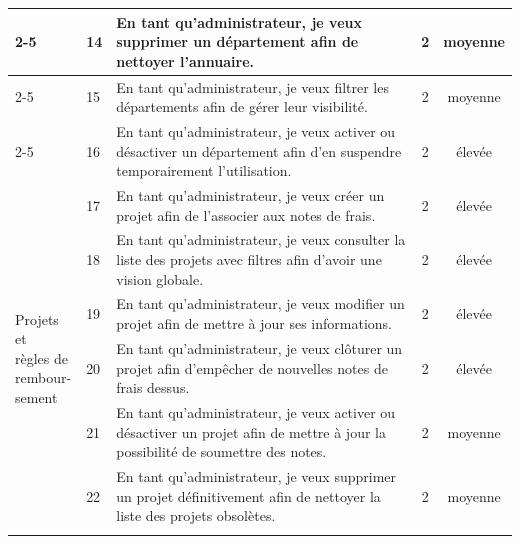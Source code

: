 \documentclass[12pt,a4paper]{report}
\begin{document}
\begin{longtable}{|p{2cm}|p{1cm}|p{8.3cm}|c|c|}
\cline{2-5}

& 14 & En tant qu'administrateur, je veux supprimer un département afin de nettoyer l’annuaire. & 2 & moyenne \\

\cline{2-5}

& 15 & En tant qu'administrateur, je veux filtrer les départements afin de gérer leur visibilité. & 2 & moyenne \\

\cline{2-5}

& 16 & En tant qu'administrateur, je veux activer ou désactiver un département afin d’en suspendre temporairement l’utilisation. & 2 & élevée \\

\hline



\multirow{8}{*}{\parbox{2.8cm}{ Projets et\\règles de\\rembour-\\sement}} & 17 & En tant qu'administrateur, je veux créer un projet afin de l’associer aux notes de frais. & 2 & élevée \\

\cline{2-5}

& 18 & En tant qu'administrateur, je veux consulter la liste des projets avec filtres afin d’avoir une vision globale. & 2 & élevée \\

\cline{2-5}

& 19 & En tant qu'administrateur, je veux modifier un projet afin de mettre à jour ses informations. & 2 & élevée \\

\cline{2-5}

& 20 & En tant qu'administrateur, je veux clôturer un projet afin d’empêcher de nouvelles notes de frais dessus. & 2 & élevée \\

\cline{2-5}

& 21 & En tant qu'administrateur, je veux activer ou désactiver un projet afin de mettre à jour la possibilité de soumettre des notes. & 2 & moyenne \\

\cline{2-5}

& 22 & En tant qu'administrateur, je veux supprimer un projet définitivement afin de nettoyer la liste des projets obsolètes. & 2 & moyenne \\

\cline{2-5}


\end{longtable}
\end{document}
